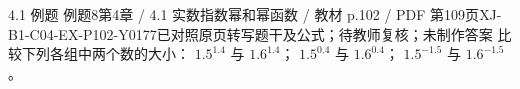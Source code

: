 \par\noindent\begin{minipage}{\linewidth}
\begin{bankitem}{4.1 例题 例题8}{第4章 / 4.1 实数指数幂和幂函数 / 教材 p.102 / PDF 第109页}{XJ-B1-C04-EX-P102-Y0177}{已对照原页转写题干及公式；待教师复核；未制作答案}
比较下列各组中两个数的大小：
$1.5^{1.4}$ 与 $1.6^{1.4}$；
$1.5^{0.4}$ 与 $1.6^{0.4}$；
$1.5^{-1.5}$ 与 $1.6^{-1.5}$。
\end{bankitem}
\end{minipage}\par\medskip
